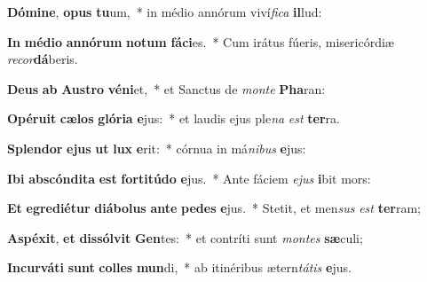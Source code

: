 \item \textbf{Dó}\textbf{mi}\textbf{ne}, \textbf{o}\textbf{pus} \textbf{tu}um,~* in médio annórum viví\textit{fi}\textit{ca} \textbf{il}lud:
\item \textbf{In} \textbf{mé}\textbf{di}\textbf{o} \textbf{an}\textbf{nó}\textbf{rum} \textbf{no}\textbf{tum} \textbf{fá}\textbf{ci}es.~* Cum irátus fúeris, misericórdiæ \textit{re}\textit{cor}\textbf{dá}beris.
\item \textbf{De}\textbf{us} \textbf{ab} \textbf{Aus}\textbf{tro} \textbf{vé}\textbf{ni}et,~* et Sanctus de \textit{mon}\textit{te} \textbf{Pha}ran:
\item \textbf{O}\textbf{pé}\textbf{ru}\textbf{it} \textbf{cæ}\textbf{los} \textbf{gló}\textbf{ri}\textbf{a} \textbf{e}jus:~* et laudis ejus ple\textit{na} \textit{est} \textbf{ter}ra.
\item \textbf{Splen}\textbf{dor} \textbf{e}\textbf{jus} \textbf{ut} \textbf{lux} \textbf{e}rit:~* córnua in má\textit{ni}\textit{bus} \textbf{e}jus:
\item \textbf{I}\textbf{bi} \textbf{abs}\textbf{cón}\textbf{di}\textbf{ta} \textbf{est} \textbf{for}\textbf{ti}\textbf{tú}\textbf{do} \textbf{e}jus.~* Ante fáciem \textit{e}\textit{jus} \textbf{i}bit mors:
\item \textbf{Et} \textbf{e}\textbf{gre}\textbf{di}\textbf{é}\textbf{tur} \textbf{di}\textbf{á}\textbf{bo}\textbf{lus} \textbf{an}\textbf{te} \textbf{pe}\textbf{des} \textbf{e}jus.~* Stetit, et men\textit{sus} \textit{est} \textbf{ter}ram;
\item \textbf{A}\textbf{spé}\textbf{xit}, \textbf{et} \textbf{dis}\textbf{sól}\textbf{vit} \textbf{Gen}tes:~* et contríti sunt \textit{mon}\textit{tes} \textbf{sæ}culi;
\item \textbf{In}\textbf{cur}\textbf{vá}\textbf{ti} \textbf{sunt} \textbf{col}\textbf{les} \textbf{mun}di,~* ab itinéribus ætern\textit{tá}\textit{tis} \textbf{e}jus.
